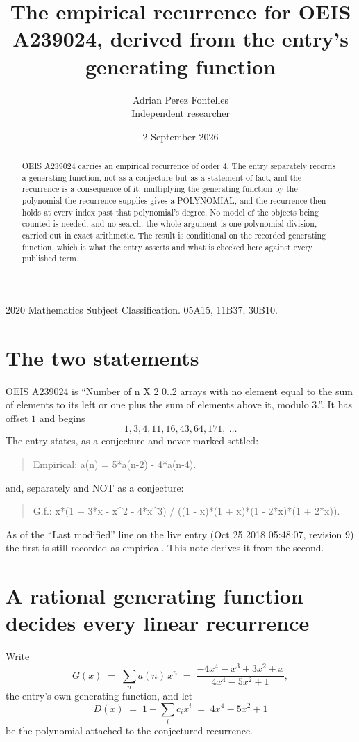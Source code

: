 \documentclass[11pt,a4paper]{article}
\title{The empirical recurrence for OEIS A239024, derived from the entry's generating function}
\author{Adrian Perez Fontelles\\ \small Independent researcher}
\date{2 September 2026}
\theoremstyle{plain}
\theoremstyle{definition}
\begin{document}
\maketitle

\begin{abstract}
OEIS A239024 carries an empirical recurrence of order $4$. The entry separately records a
generating function, not as a conjecture but as a statement of fact, and the recurrence is a
consequence of it: multiplying the generating function by the polynomial the recurrence
supplies gives a POLYNOMIAL, and the recurrence then holds at every index past that
polynomial's degree. No model of the objects being counted is needed, and no search: the
whole argument is one polynomial division, carried out in exact arithmetic. The result is
conditional on the recorded generating function, which is what the entry asserts and what is
checked here against every published term.
\end{abstract}

\noindent\small 2020 Mathematics Subject Classification. 05A15, 11B37, 30B10.\normalsize

\section{The two statements}

OEIS A239024 is ``Number of n X 2 0..2 arrays with no element equal to the sum of elements to its left or one plus the sum of elements above it, modulo 3.''. It has offset $1$ and begins
\[
1, 3, 4, 11, 16, 43, 64, 171,\ \dots
\]
The entry states, as a conjecture and never marked settled:
\begin{quote}
Empirical: a(n) = 5*a(n-2) - 4*a(n-4).
\end{quote}
and, separately and NOT as a conjecture:
\begin{quote}
G.f.: x*(1 + 3*x - x\^{}2 - 4*x\^{}3) / ((1 - x)*(1 + x)*(1 - 2*x)*(1 + 2*x)).
\end{quote}
As of the ``Last modified'' line on the live entry (Oct 25 2018 05:48:07, revision 9) the first is still
recorded as empirical. This note derives it from the second.

\section{A rational generating function decides every linear recurrence}

Write
\[
G(x)\;=\;\sum_{n}a(n)\,x^{n}\;=\;\frac{- 4 x^{4} - x^{3} + 3 x^{2} + x}{4 x^{4} - 5 x^{2} + 1},
\]
the entry's own generating function, and let
\[
D(x)\;=\;1-\sum_i c_i x^{i}\;=\;4 x^{4} - 5 x^{2} + 1
\]
be the polynomial attached to the conjectured recurrence.
\end{document}
